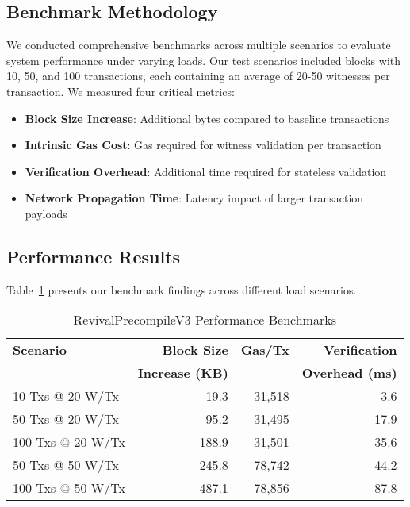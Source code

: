 \documentclass{article}
\begin{document}
\subsection{Benchmark Methodology}

We conducted comprehensive benchmarks across multiple scenarios to evaluate system performance under varying loads. Our test scenarios included blocks with 10, 50, and 100 transactions, each containing an average of 20-50 witnesses per transaction. We measured four critical metrics:

\begin{itemize}
\item \textbf{Block Size Increase}: Additional bytes compared to baseline transactions
\item \textbf{Intrinsic Gas Cost}: Gas required for witness validation per transaction
\item \textbf{Verification Overhead}: Additional time required for stateless validation
\item \textbf{Network Propagation Time}: Latency impact of larger transaction payloads~\cite{onuorah2020propagation}
\end{itemize}

\subsection{Performance Results}

Table~\ref{tab:benchmark-results} presents our benchmark findings across different load scenarios.

\begin{table}[h]
\centering
\caption{RevivalPrecompileV3 Performance Benchmarks}
\label{tab:benchmark-results}
\begin{tabular}{@{}lrrr@{}}
\toprule
\textbf{Scenario} & \textbf{Block Size} & \textbf{Gas/Tx} & \textbf{Verification} \\
 & \textbf{Increase (KB)} & & \textbf{Overhead (ms)} \\
\midrule
10 Txs @ 20 W/Tx & 19.3 & 31,518 & 3.6 \\
50 Txs @ 20 W/Tx & 95.2 & 31,495 & 17.9 \\
100 Txs @ 20 W/Tx & 188.9 & 31,501 & 35.6 \\
50 Txs @ 50 W/Tx & 245.8 & 78,742 & 44.2 \\
100 Txs @ 50 W/Tx & 487.1 & 78,856 & 87.8 \\
\bottomrule
\end{tabular}
\end{table}
\end{document}
